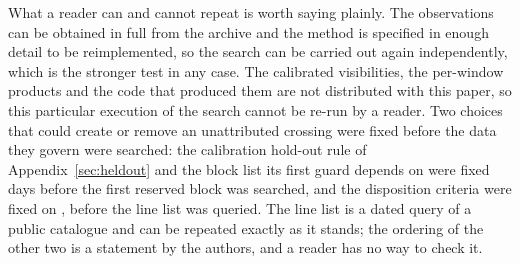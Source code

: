 What a reader can and cannot repeat is worth saying plainly. The observations
can be obtained in full from the archive and the method is specified in enough
detail to be reimplemented, so the search can be carried out again
independently, which is the stronger test in any case. The calibrated
visibilities, the per-window products and the code that produced them are not
distributed with this paper, so this particular execution of the search cannot
be re-run by a reader. Two choices that could create or remove an unattributed
crossing were fixed before the data they govern were searched: the calibration
hold-out rule of Appendix~\ref{sec:heldout} and the block list its first guard
depends on were fixed \HoLeadBlockDays{} days before the first reserved block
was searched, and the disposition criteria were fixed on \MkCritDate, before
the line list was queried. The line list is a dated query of a public
catalogue and can be repeated exactly as it stands; the ordering of the other
two is a statement by the authors, and a reader has no way to check it.
